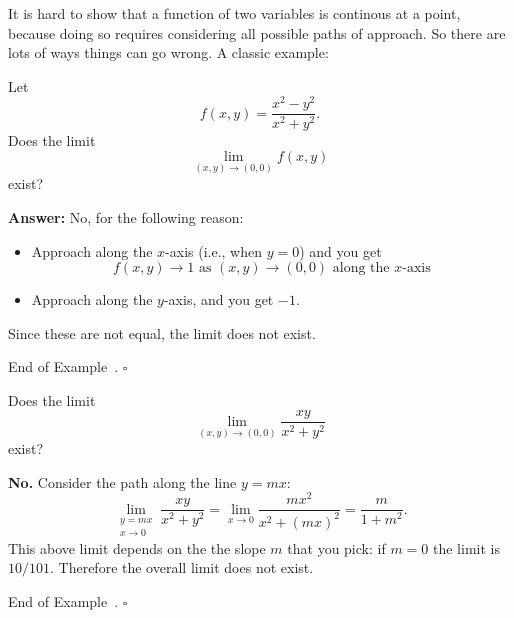 \documentclass[10pt]{article}
\theoremstyle{definition}
\newtheorem{example}[theorem]{Example}
\renewenvironment{example}
{\begin{oldexample}}
  {\par\smallskip\hfill   End of Example~\theexample. $\square$    \par\end{oldexample}}
\newcommand{\vt}{\vskip 5mm} %
\newcommand{\Fl}{\vt\noindent\textbf} %
\newcommand{\1}[1]{\textbf{1}_{\left[#1\right]}} %
\begin{document}
It is hard to show that a function of two variables is continous at a point,
because doing so requires considering all possible paths of approach. So there
are lots of ways things can go wrong. A classic example:

\begin{example}
  \label{ex:aaa}
  Let
  \begin{equation*}
    f(x,y) = \frac{x^{2}-y^{2}}{x^{2}+y^{2}}.
  \end{equation*}
  Does the limit
  \begin{equation*}
    \lim_{(x,y)\to (0,0)}f(x,y) 
  \end{equation*}
  exist?

  \Fl{Answer:} No, for the following reason:
  \begin{itemize}
    \item Approach along the $x$-axis (i.e., when $y=0$) and you get
    \begin{equation*}
      f(x,y) \to 1 \text{ as } (x,y)\to (0,0) \text{ along the $x$-axis}
    \end{equation*}
    \item Approach along the $y$-axis, and you get $-1$.
  \end{itemize}
  Since these are not equal, the limit does not exist.
\end{example}

\begin{example}
  Does the limit
  \begin{equation*}
    \lim_{(x,y)\to (0,0)} \frac{xy}{x^{2}+y^{2}}
  \end{equation*}
  exist?

  \Fl{No.} Consider the path along the line $y=mx$:
  \begin{equation*}
    \lim_{\substack{y=mx\\ x\to 0}} \frac{xy}{x^{2}+y^{2}} =  \lim_{x\to 0} \frac{mx^{2}}{x^{2}+(mx)^{2}} = \frac{m}{1+m^{2}}.
  \end{equation*}
  This above limit depends on the the slope $m$ that you pick: if $m=0$ the limit is
  $10/101$. Therefore the overall limit does not exist.
\end{example}
\end{document}
